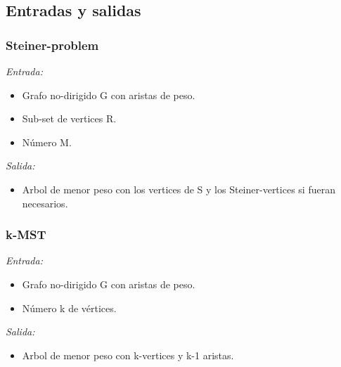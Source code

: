 \documentclass[spanish,12pt]{elsarticle}
\begin{document}
\subsection{Entradas y salidas}
\subsubsection*{Steiner-problem}
\textit{Entrada: }
\begin{itemize}
\item Grafo no-dirigido G con aristas de peso.
\item Sub-set de vertices R.
\item Número M.
\end{itemize}

\textit{Salida: }
\begin{itemize}
\item Arbol de menor peso con los vertices de S y los Steiner-vertices si fueran necesarios.\\
\end{itemize}
\clearpage
\subsubsection*{k-MST}
\textit{Entrada: }
\begin{itemize}
\item Grafo no-dirigido G con aristas de peso.
\item Número k de vértices.
\end{itemize}

\textit{Salida: }
\begin{itemize}
\item Arbol de menor peso con k-vertices y k-1 aristas.
\end{itemize}
\end{document}
